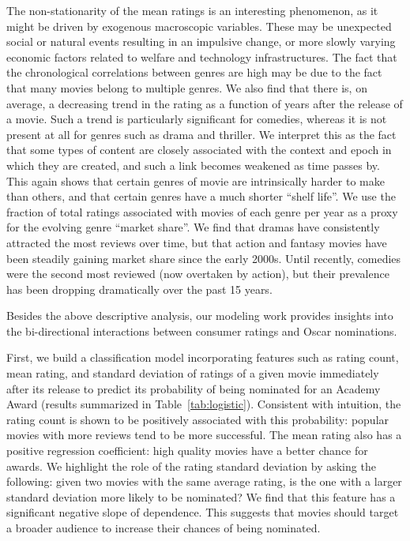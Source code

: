 \documentclass[dvipsnames]{article}
\begin{document}
The non-stationarity of the mean ratings is an interesting phenomenon, as it might be driven by exogenous macroscopic variables. These may be unexpected social or natural events resulting in an impulsive change, or more slowly varying economic factors related to welfare and technology infrastructures. The fact that the chronological correlations between genres are high may be due to the fact that many movies belong to multiple genres. We also find that there is, on average, a decreasing trend in the rating as a function of years after the release of a movie. Such a trend is particularly significant for comedies, whereas it is not present at all for genres such as drama and thriller. We interpret this as the fact that some types of content are closely associated with the context and epoch in which they are created, and such a link becomes weakened as time passes by. This again shows that certain genres of movie are intrinsically harder to make than others, and that certain genres have a much shorter ``shelf life''. We use the fraction of total ratings associated with movies of each genre per year as a proxy for the evolving genre ``market share''. We find that dramas have consistently attracted the most reviews over time, but that action and fantasy movies have been steadily gaining market share since the early 2000s. Until recently, comedies were the second most reviewed (now overtaken by action), but their prevalence has been dropping dramatically over the past 15 years.

Besides the above descriptive analysis, our modeling work provides insights into the bi-directional interactions between consumer ratings and Oscar nominations. 

First, we build a classification model incorporating features such as rating count, mean rating, and standard deviation of ratings of a given movie immediately after its release to predict its probability of being nominated for an Academy Award (results summarized in Table~\ref{tab:logistic}). Consistent with intuition, the rating count is shown to be positively associated with this probability: popular movies with more reviews tend to be more successful. The mean rating also has a positive regression coefficient: high quality movies have a better chance for awards. We highlight the role of the rating standard deviation by asking the following: given two movies with the same average rating, is the one with a larger standard deviation more likely to be nominated? We find that this feature has a significant negative slope of dependence. This suggests that movies should target a broader audience to increase their chances of being nominated.
\end{document}
